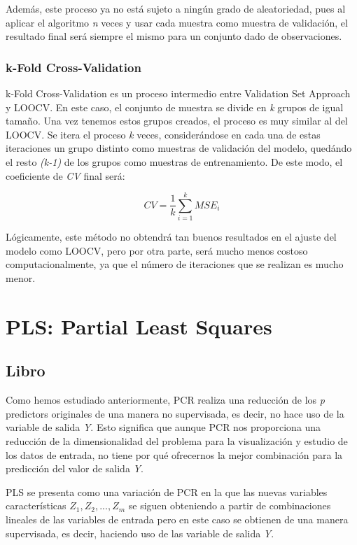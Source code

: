 \documentclass[12pt,a4paper,Spanish]{book}
\begin{document}
Además, este proceso ya no está sujeto a ningún grado de aleatoriedad, pues al aplicar el algoritmo \textit{n} veces y usar cada muestra como muestra de validación, el resultado final será siempre el mismo para un conjunto dado de observaciones.



\subsection{k-Fold Cross-Validation}

k-Fold Cross-Validation es un proceso intermedio entre Validation Set Approach y LOOCV. En este caso, el conjunto de muestra se divide en \textit{k} grupos de igual tamaño. Una vez tenemos estos grupos creados, el proceso es muy similar al del LOOCV. Se itera el proceso \textit{k} veces, considerándose en cada una de estas iteraciones un grupo distinto como muestras de validación del modelo, quedándo el resto \textit{(k-1)} de los grupos como muestras de entrenamiento. De este modo, el coeficiente de \textit{CV} final será:

\begin{equation}
CV=\dfrac{1}{k}\sum_{i=1}^{k}MSE_i
\end{equation}

Lógicamente, este método no obtendrá tan buenos resultados en el ajuste del modelo como LOOCV, pero por otra parte, será mucho menos costoso computacionalmente, ya que el número de iteraciones que se realizan es mucho menor.

\chapter{PLS: Partial Least Squares}

\section{Libro}

Como hemos estudiado anteriormente, PCR realiza una reducción de los \textit{p} predictors originales de una manera no supervisada, es decir, no hace uso de la variable de salida \textit{Y}. Esto significa que aunque PCR nos proporciona una reducción de la dimensionalidad del problema para la visualización y estudio de los datos de entrada, no tiene por qué ofrecernos la mejor combinación para la predicción del valor de salida \textit{Y}.

PLS se presenta como una variación de PCR en la que las nuevas variables características $Z_1,Z_2,...,Z_m$ se siguen obteniendo a partir de combinaciones lineales de las variables de entrada pero en este caso se obtienen de una manera supervisada, es decir, haciendo uso de las variable de salida \textit{Y}.
\end{document}
